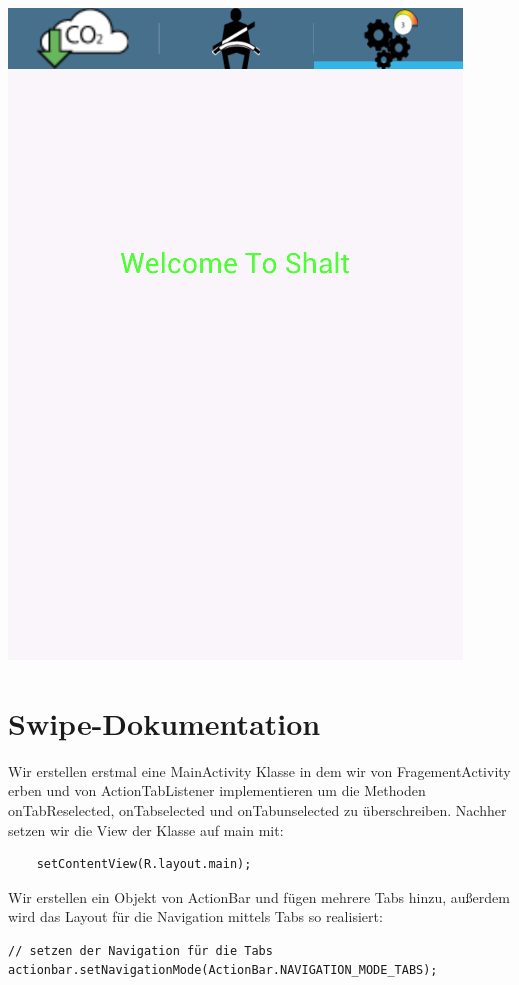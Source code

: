 \includegraphics[scale=0.4]{images/Schalt.png}

\newpage
\section{Swipe-Dokumentation}
Wir erstellen erstmal eine MainActivity Klasse in dem wir von FragementActivity erben und von ActionTabListener implementieren um die Methoden onTabReselected, onTabselected und onTabunselected zu überschreiben.  
\newline            
Nachher setzen wir die View der Klasse auf main mit:
\begin{lstlisting}
	setContentView(R.layout.main);	
\end{lstlisting}

\newline
Wir erstellen ein Objekt von ActionBar und fügen mehrere Tabs hinzu, außerdem wird das Layout für die Navigation mittels Tabs so realisiert:
\begin{lstlisting}
// setzen der Navigation für die Tabs
actionbar.setNavigationMode(ActionBar.NAVIGATION_MODE_TABS);
\end{lstlisting}


